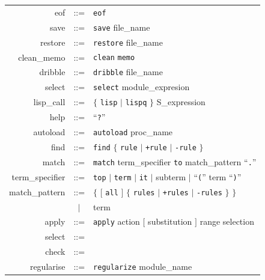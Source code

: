 \documentclass[a4paper]{memoir}
\begin{document}
\begin{tabular}{r c l}
  eof &::=& \verb|eof| \\
  save &::=& \verb|save| file\_name \\
  restore &::=& \verb|restore| file\_name \\
  clean\_memo &::=& \verb|clean| \verb|memo| \\
  dribble &::=& \verb|dribble| file\_name \\
  select &::=& \verb|select| module\_expresion \\
  lisp\_call &::=& $\{$ \verb|lisp| $|$ \verb|lispq| $\}$ S\_expression \\
  help &::=& ``\verb|?|'' \\
  autoload &::=& \verb|autoload| proc\_name \\
  find &::=& \verb|find| $\{$ \verb|rule| $|$ \verb|+rule| $|$ \verb|-rule|
    $\}$ \\
  match &::=& \verb|match| term\_specifier \verb|to| match\_pattern
    ``\verb|.|'' \\
  term\_specifier &::=& \verb|top| $|$ \verb|term| $|$ \verb|it| $|$ subterm
    $|$ ``\verb|(|'' term ``\verb|)|'' \\
  match\_pattern &::=& $\{$ $[$ \verb|all| $]$
    $\{$ \verb|rules| $|$ \verb|+rules| $|$ \verb|-rules| $\}$ $\}$ \\
    &$|$& term \\
  apply &::=& \verb|apply| action $[$ substitution $]$ range selection \\
  select &::=& \\
  check &::=& \\
  regularise &::=& \verb|regularize| module\_name \\
\end{tabular}
\textrm{}

\end{document}
